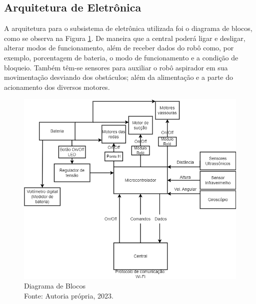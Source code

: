 \subsection{Arquitetura de Eletrônica}
A arquitetura para o subsistema de eletrônica utilizada foi o diagrama de blocos, como se observa na Figura \ref{fig6}. De maneira que a central poderá ligar e desligar, alterar modos de funcionamento, além de receber dados do robô como, por exemplo, porcentagem de bateria, o modo de funcionamento e a condição de bloqueio.
Também têm-se sensores para auxiliar o robô aspirador em sua movimentação desviando dos obstáculos; além da alimentação e a parte do acionamento dos diversos motores.

\begin{figure}[h!]
\includegraphics[width=\textwidth]{figuras/diagrama_bloco2.png}
\caption{Diagrama de Blocos \\ Fonte: Autoria própria, 2023.}
\label{fig6}
\end{figure}


